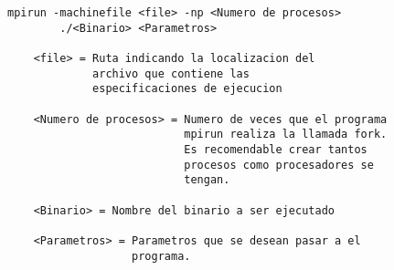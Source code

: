 \begin{lstlisting}[frame=single]
mpirun -machinefile <file> -np <Numero de procesos>
		./<Binario> <Parametros>

	<file> = Ruta indicando la localizacion del
			 archivo que contiene las
			 especificaciones de ejecucion

    <Numero de procesos> = Numero de veces que el programa
                           mpirun realiza la llamada fork.
                           Es recomendable crear tantos
                           procesos como procesadores se
                           tengan.

    <Binario> = Nombre del binario a ser ejecutado

    <Parametros> = Parametros que se desean pasar a el
                   programa.

\end{lstlisting}

